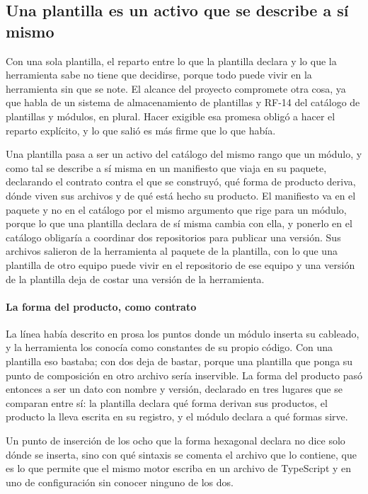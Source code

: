 \subsection{Una plantilla es un activo que se describe a sí mismo}

Con una sola plantilla, el reparto entre lo que la plantilla declara y lo que
la herramienta sabe no tiene que decidirse, porque todo puede vivir en la
herramienta sin que se note. El alcance del proyecto compromete otra cosa, ya
que habla de un sistema de almacenamiento de plantillas y RF-14 del catálogo
de plantillas y módulos, en plural. Hacer exigible esa promesa obligó a hacer
el reparto explícito, y lo que salió es más firme que lo que había.

Una plantilla pasa a ser un activo del catálogo del mismo rango que un
módulo, y como tal se describe a sí misma en un manifiesto que viaja en su
paquete, declarando el contrato contra el que se construyó, qué forma de
producto deriva, dónde viven sus archivos y de qué está hecho su producto. El
manifiesto va en el paquete y no en el catálogo por el mismo argumento que
rige para un módulo, porque lo que una plantilla declara de sí misma cambia
con ella, y ponerlo en el catálogo obligaría a coordinar dos repositorios para
publicar una versión. Sus archivos salieron de la herramienta al paquete de
la plantilla, con lo que una plantilla de otro equipo puede vivir en el
repositorio de ese equipo y una versión de la plantilla deja de costar una
versión de la herramienta.

\paragraph*{La forma del producto, como contrato}

La línea había descrito en prosa los puntos donde un módulo inserta su
cableado, y la herramienta los conocía como constantes de su propio código.
Con una plantilla eso bastaba; con dos deja de bastar, porque una plantilla
que ponga su punto de composición en otro archivo sería inservible. La forma
del producto pasó entonces a ser un dato con nombre y versión, declarado en
tres lugares que se comparan entre sí: la plantilla declara qué forma derivan
sus productos, el producto la lleva escrita en su registro, y el módulo
declara a qué formas sirve.

Un punto de inserción de los ocho que la forma hexagonal declara no dice solo
dónde se inserta, sino con qué sintaxis se comenta el archivo que lo contiene,
que es lo que permite que el mismo motor escriba en un archivo de TypeScript y
en uno de configuración sin conocer ninguno de los dos.

